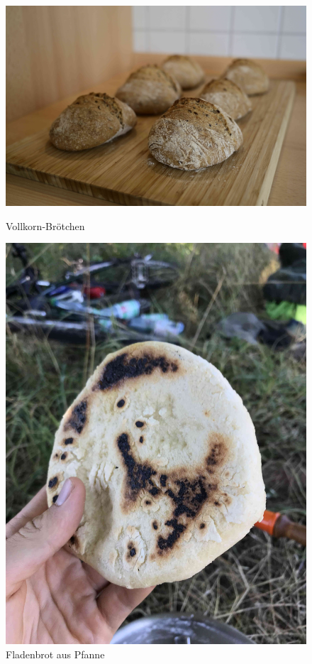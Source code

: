 \documentclass[a4paper, 12pt]{scrbook} 								%
\numberwithin{equation}{section} 									%
\begin{document}
		\begin{figure}[h]
			\centering
			\begin{minipage}{0.49\textwidth}
				\includegraphics[width = \textwidth]{media/vollkorn_broetchen.jpg}
				\caption{Vollkorn-Brötchen}
			\end{minipage}
			\begin{minipage}{0.5\textwidth}
				\includegraphics[width = \textwidth]{media/Fladenbrot.JPG}
				\caption{Fladenbrot aus Pfanne}
			\end{minipage}
		\end{figure}
\end{document}
